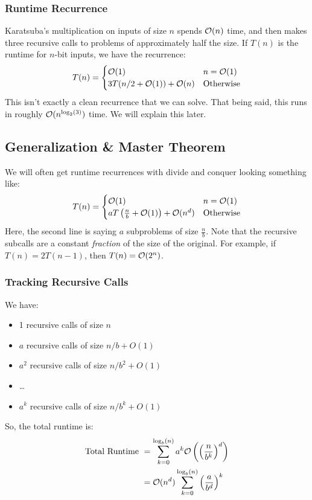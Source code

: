 \documentclass[letterpaper]{article}
\begin{document}
\subsubsection{Runtime Recurrence}
Karatsuba's multiplication on inputs of size $n$ spends $\mathcal{O}(n)$ time, and then makes three recursive calls to problems of approximately half the size. If $T(n)$ is the runtime for $n$-bit inputs, we have the recurrence:
\[T(n) = \begin{cases}
    \mathcal{O}(1) & n = \mathcal{O}(1) \\ 
    3T(n / 2 + \mathcal{O}(1)) + \mathcal{O}(n) & \text{Otherwise}
\end{cases}\]
This isn't exactly a clean recurrence that we can solve. That being said, this runs in roughly $\mathcal{O}(n^{\log_{2}(3)})$ time. We will explain this later. 

\subsection{Generalization \& Master Theorem}
We will often get runtime recurrences with divide and conquer looking something like: 
\[T(n) = \begin{cases}
    \mathcal{O}(1) & n = \mathcal{O}(1) \\ 
    aT\left(\frac{n}{b} + \mathcal{O}(1)\right) + \mathcal{O}(n^d) & \text{Otherwise}
\end{cases}\]
Here, the second line is saying $a$ subproblems of size $\frac{n}{b}$. Note that the recursive subcalls are a constant \emph{fraction} of the size of the original. For example, if $T(n) = 2T(n - 1)$, then $T(n) = \mathcal{O}(2^n)$. 

\subsubsection{Tracking Recursive Calls}
We have: 
\begin{itemize}
    \item 1 recursive calls of size $n$
    \item $a$ recursive calls of size $n / b + O(1)$
    \item $a^2$ recursive calls of size $n / b^2 + O(1)$
    \item \dots
    \item $a^k$ recursive calls of size $n / b^k + O(1)$
\end{itemize}
So, the total runtime is: 
\begin{equation*}
    \begin{aligned}
        \text{Total Runtime } &= \sum_{k = 0}^{\log_{b}(n)} a^k \mathcal{O}\left(\left(\frac{n}{b^k}\right)^d\right) \\ 
            &= \mathcal{O}(n^d) \sum_{k = 0}^{\log_{b}(n)} \left(\frac{a}{b^d}\right)^k
    \end{aligned}
\end{equation*}
\end{document}
